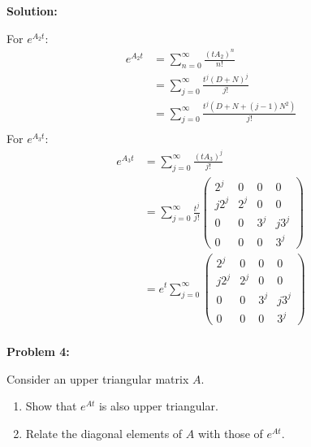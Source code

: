 \documentclass[12pt]{article}
\newenvironment{problem}[1]{
    \textbf{Problem #1:}
}{
    \rmfamily \vspace{1em}
}
\newenvironment{solution}{
    \textbf{Solution:}
    
}{
    
    \vspace{2em}
}
\begin{document}
\begin{solution}
    For \(e^{A_2t}\):
    \[
        \begin{aligned}
            e^{A_2t} &= \sum_{n=0}^\infty \frac{(tA_2)^n}{n!} \\
            &= \sum_{j=0}^\infty \frac{t^j(D + N)^j}{j!}\\
            &= \sum_{j=0}^\infty \frac{t^j(D + N + (j-1)N^2)}{j!}\\
        \end{aligned}
    \]
    For \(e^{A_3 t}\):
    \[
        \begin{aligned}
            e^{A_3 t} &= \sum_{j=0}^\infty \frac{(tA_3)^j}{j!}\\
            &= \sum_{j=0}^\infty \frac{t^j}{j!} \begin{pmatrix}
                2^j & 0 & 0 & 0 \\
                j2^j & 2^j & 0 & 0 \\
                0 & 0 & 3^j & j3^j \\
                0 & 0 & 0 & 3^j
            \end{pmatrix}\\
            &= e^t \sum_{j=0}^\infty \begin{pmatrix}
                2^j & 0 & 0 & 0 \\
                j2^j & 2^j & 0 & 0 \\
                0 & 0 & 3^j & j3^j \\
                0 & 0 & 0 & 3^j
            \end{pmatrix}\\
        \end{aligned}
    \]
\end{solution}

\newpage

\begin{problem}{4}
    Consider an upper triangular matrix \(A\).
    \begin{enumerate}[label=\alph*)]
        \item Show that \(e^{At}\) is also upper triangular.
        \item Relate the diagonal elements of \(A\) with those of \(e^{At}\).
    \end{enumerate}
\end{problem}
\end{document}
